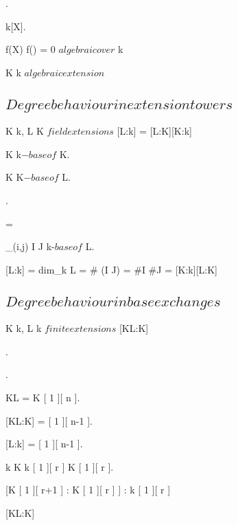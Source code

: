 \documentclass[a5paper]{book}
\begin{document}
{{{			.

			 \in k[X].

			f(X)  \logicand f(\theta) = 0 \imp \theta $ algebraic over $ k 
		}

		K \extends k $ algebraic extension $
	}
	\newpage	



	\subsection{ $ Degree behaviour in extension towers $ }
	
	{
		K \extends k, L \extends K $ field extensions $
	}
	\proposition
	{
		[L:k] = [L:K][K:k]
	}
	\demonstration
	{
		\exists \;  \subset K \; k$-base of $ K.

		\exists \;  \subset K \; K$-base of $ L.

		{
			.

			{
			}

			\theta = 
			
		}

		_{(i,j) \in I \times J } \; k-$base of $ L.

		[L:k] = dim_k L = \# (I \times J) = \#I \cdot \#J = [K:k][L:K]
	}
	\newpage


	
	\subsection{ $ Degree behaviour in base exchanges $ }
	
	{
		K \extends k, L \extends k $ finite extensions $
	}
	\proposition
	{
		[KL:K] \leq [L:k]
	}
	\demonstration
	{
		 \in \N.

		.

		KL = K [ 1 ][ n ].

		[KL:K] = [ 1 ][ n-1 ].

		[L:k] = [ 1 ][ n-1 ].

		{
			k \subset K \imp k [ 1 ][ r ] \subset K [ 1 ][ r ].

			[K [ 1 ][ r+1 ] : K [ 1 ][ r ] ] \leq [k \vect{ \theta_i }{ i }[ 1 ][ r+1 ] : k [ 1 ][ r ]
		}

		[KL:K] \leq [L:k]
	}
	\newpage
}
\end{document}
